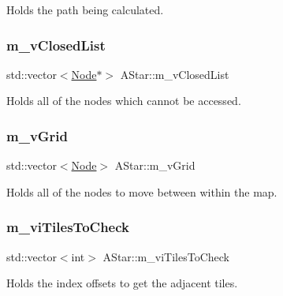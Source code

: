 Holds the path being calculated. 

\mbox{\label{class_a_star_af08da815977f33f6ba9f5b95f9ef052c}} 
\subsubsection{\texorpdfstring{m\+\_\+v\+Closed\+List}{m\_vClosedList}}
{\footnotesize\ttfamily std\+::vector$<$\hyperlink{struct_node}{Node}$\ast$$>$ A\+Star\+::m\+\_\+v\+Closed\+List\hspace{0.3cm}{\ttfamily [private]}}



Holds all of the nodes which cannot be accessed. 

\mbox{\label{class_a_star_a8597b13604069f52b8b29961332fa8bc}} 
\subsubsection{\texorpdfstring{m\+\_\+v\+Grid}{m\_vGrid}}
{\footnotesize\ttfamily std\+::vector$<$\hyperlink{struct_node}{Node}$>$ A\+Star\+::m\+\_\+v\+Grid\hspace{0.3cm}{\ttfamily [private]}}



Holds all of the nodes to move between within the map. 

\mbox{\label{class_a_star_af2d53752390a0b942ae3ed49ad068fae}} 
\subsubsection{\texorpdfstring{m\+\_\+vi\+Tiles\+To\+Check}{m\_viTilesToCheck}}
{\footnotesize\ttfamily std\+::vector$<$int$>$ A\+Star\+::m\+\_\+vi\+Tiles\+To\+Check\hspace{0.3cm}{\ttfamily [private]}}



Holds the index offsets to get the adjacent tiles. 

